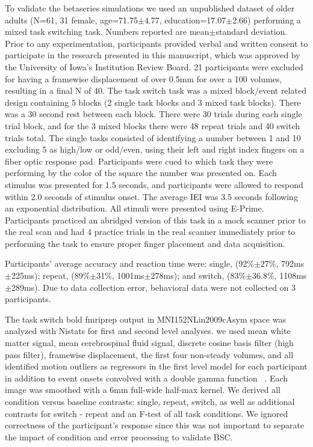 \documentclass[10pt,letterpaper]{article}
\begin{document}
To validate the betaseries simulations we used an unpublished dataset
of older adults (N=61, 31 female, age=71.75$\pm$4.77, education=17.07$\pm$2.66)
performing a mixed task switching task.
Numbers reported are mean$\pm$standard deviation.
Prior to any experimentation, participants provided verbal and written consent
to participate in the research presented in this manuscript, which was approved
by the University of Iowa's Institution Review Board.
21 participants were excluded for having a framewise displacement of over 0.5mm for
over a 100 volumes, resulting in a final N of 40.
The task switch task was a mixed block/event related design containing
5 blocks (2 single task blocks and 3 mixed task blocks).
There was a 30 second rest between each block.
There were 30 trials during each single trial block,
and for the 3 mixed blocks there were 48 repeat trials and 40 switch trials total.
The single tasks consisted of identifying a number between
1 and 10 excluding 5 as high/low or odd/even, using their left and right index fingers
on a fiber optic response pad.
Participants were cued to which task they were performing by the color of the square
the number was presented on.
Each stimulus was presented for 1.5 seconds, and participants were allowed
to respond within 2.0 seconds of stimulus onset.
The average IEI was 3.5 seconds following an exponential distribution.
All stimuli were presented using E-Prime.
Participants practiced an abridged version of this task in a mock scanner
prior to the real scan and had 4 practice trials in the real scanner immediately
prior to performing the task to ensure proper finger placement and data acquisition.

Participants' average accuracy and reaction time were:
single, (92\%$\pm$27\%, 792ms$\pm$225ms); repeat, (89\%$\pm$31\%, 1001ms$\pm$278ms);
and switch, (83\%$\pm$36.8\%, 1108ms$\pm$289ms).
Due to data collection error, behavioral data were not collected on 3 participants.

The task switch bold fmriprep output in MNI152NLin2009cAsym space
was analyzed with Nistats for first and second level analyses.
we used mean white matter signal, mean cerebrospinal fluid signal,
discrete cosine basis filter (high pass filter), framewise displacement, the first four non-steady volumes, and
all identified motion outliers as regressors in the first level model for each participant
in addition to event onsets convolved with a double gamma function ~\cite{Glover1999}.
Each image was smoothed with a 6mm full-wide half-max kernel.
We derived all condition versus baseline contrasts: single, repeat, switch, as well as
additional contrasts for switch - repeat and an F-test of all task conditions.
We ignored correctness of the participant's response since this was not important to
separate the impact of condition and error processing to validate BSC.
\end{document}
